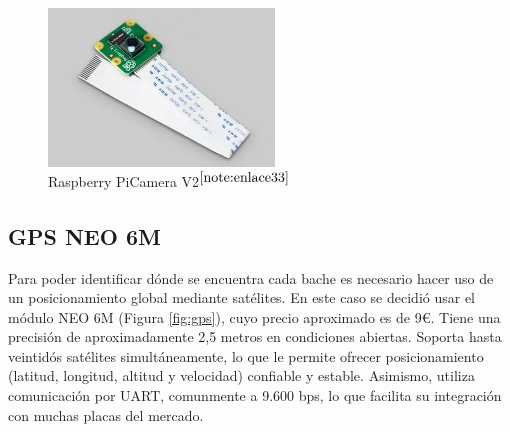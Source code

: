 \begin{figure} [h!]
	\begin{center}
		\includegraphics[width=6cm]{figs/campi.png}
	\end{center}
	\caption{Raspberry PiCamera V2$^{\ref{note:enlace33}}$} 
\label{fig:raspberrycam}
\end{figure}

\setcounter{footnote}{33} %

\subsection{GPS NEO 6M}
\label{subsec:gps}

Para poder identificar dónde se encuentra cada bache es necesario hacer uso de un posicionamiento global mediante satélites. En este caso se decidió usar el módulo NEO 6M (Figura \ref{fig:gps}), cuyo precio aproximado es de 9€. Tiene una precisión de aproximadamente 2,5 metros en condiciones abiertas. Soporta hasta veintidós satélites simultáneamente, lo que le permite ofrecer posicionamiento (latitud, longitud, altitud y velocidad) confiable y estable. Asimismo, utiliza comunicación por \ac{UART}, comunmente a 9.600 bps, lo que facilita su integración con muchas placas del mercado.



